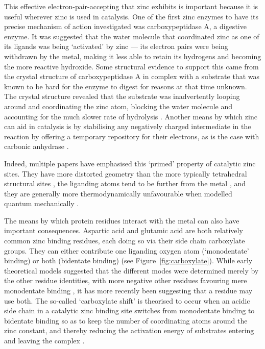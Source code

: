 This effective electron-pair-accepting that zinc exhibits is important because it is useful wherever zinc is used in catalysis. One of the first zinc enzymes to have its precise mechanism of action investigated was carboxypeptidase A, a digestive enzyme. It was suggested that the water molecule that coordinated zinc as one of its ligands was being `activated' by zinc --- its electron pairs were being withdrawn by the metal, making it less able to retain its hydrogens and becoming the more reactive hydroxide. Some structural evidence to support this came from the crystal structure of carboxypeptidase A in complex with a substrate that was known to be hard for the enzyme to digest for reasons at that time unknown. The crystal structure revealed that the substrate was inadvertently looping around and coordinating the zinc atom, blocking the water molecule and accounting for the much slower rate of hydrolysis \cite{christianson1986x}. Another means by which zinc can aid in catalysis is by stabilising any negatively charged intermediate in the reaction by offering a temporary repository for their electrons, as is the case with carbonic anhydrase \cite{christianson1996carbonic}.

Indeed, multiple papers have emphasised this `primed' property of catalytic zinc sites. They have more distorted geometry than the more typically tetrahedral structural sites \cite{roe1999zinc}, the liganding atoms tend to be further from the metal \cite{lee2008physical}, and they are generally more thermodynamically unfavourable when modelled quantum mechanically \cite{sousa2009zinc}.

The means by which protein residues interact with the metal can also have important consequences. Aspartic acid and glutamic acid are both relatively common zinc binding residues, each doing so via their side chain carboxylate groups. They can either contribute one liganding oxygen atom (`monodentate' binding) or both (bidentate binding) (see
Figure~\ref{fig:carboxylate}). While early theoretical models suggested that the different modes were determined merely by the other residue identities, with more negative other residues favouring mere monodentate binding \cite{ryde1999carboxylate}, it has more recently been suggesting that a residue may use both. The so-called `carboxylate shift' is theorised to occur when an acidic side chain in a catalytic zinc binding site switches from monodentate binding to bidentate binding so as to keep the number of coordinating atoms around the zinc constant, and thereby reducing the activation energy of substrates entering and leaving the complex \cite{sousa2007carboxylate}.

